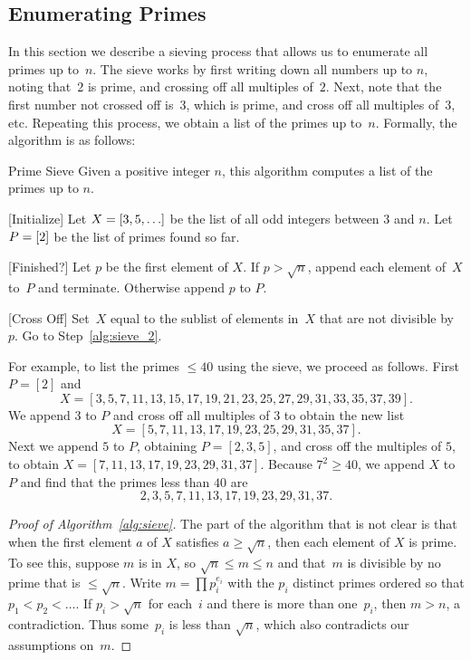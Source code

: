 \subsection{Enumerating Primes}\label{sec:enum_primes}
In this section we describe a sieving process that allows us to
enumerate all primes up to~$n$.  The sieve works by first writing down
all numbers up to $n$, noting that~$2$ is prime, and crossing off all
multiples of~$2$.  Next, note that the first number not crossed off
is~$3$, which is prime, and cross off all multiples of~$3$, etc.
Repeating this process, we obtain a list of the primes up to~$n$.
Formally, the algorithm is as follows:
\begin{algorithm}{Prime Sieve}\label{alg:sieve}
Given a positive integer $n$, this algorithm computes a list of the
primes up to $n$.
\begin{steps}
\item{}[Initialize] Let $X= [3,5,\ldots]$ be the list
of all odd integers between $3$ and $n$.  Let $P= [2]$ be the list
of primes found so far.
\item{}[Finished?]\label{alg:sieve_2}
Let $p$ be the first element of $X$.
If $p>\sqrt{n}$, append each element of~$X$
to~$P$ and terminate.   Otherwise append $p$ to $P$.
\item{}[Cross Off]
Set~$X$ equal to the sublist of elements in~$X$ that
are not divisible by~$p$.
Go to Step~\ref{alg:sieve_2}.
\end{steps}
\end{algorithm}
For example, to list the primes $\leq 40$ using the sieve, we
proceed as follows.  First $P=[2]$ and
$$X = [3,5,7,11,13,15,17,19,21,23,25,27,29,31,33,35,37,39].$$
We append $3$ to $P$ and cross off all multiples of $3$ to obtain
the new list
$$X = [5,7,11,13,17,19,23,25,29,31,35,37].$$
Next we append $5$ to $P$, obtaining $P=[2,3,5]$, and cross off
the multiples of $5$, to obtain $X = [7,11,13,17,19,23,29,31,37].$
Because $7^2\geq 40$, we append $X$ to $P$ and find that the
primes less than $40$ are
$$
  2,3,5, 7,11,13,17,19,23,29,31,37.
$$
\begin{proof}[Proof of Algorithm~\ref{alg:sieve}]
The part of the algorithm that is not clear is that
when the first element $a$ of $X$ satisfies $a\geq \sqrt{n}$,
then each element of $X$ is prime.
To see this, suppose $m$ is in $X$, so
$\sqrt{n} \leq m\leq n$ and that~$m$ is divisible by
no prime that is $\leq \sqrt{n}$.  Write $m=\prod p_i^{e_i}$ with
the $p_i$ distinct primes ordered so that $p_1<p_2<\ldots$.  If $p_i>\sqrt{n}$
for each~$i$ and there is more than one~$p_i$, then $m>n$,
a contradiction.  Thus some~$p_i$ is less than $\sqrt{n}$,
which also contradicts our assumptions on~$m$.
\end{proof}


